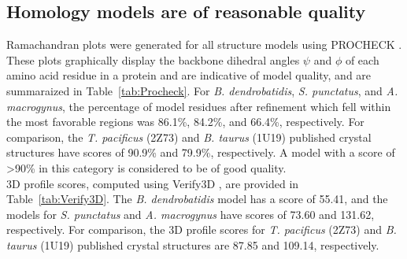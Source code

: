 \subsection{Homology models are of reasonable quality}
Ramachandran plots were generated for all structure models using PROCHECK \cite{Laskowski1993,Wiederstein2007}. These plots graphically display the backbone dihedral angles $\psi$ and $\phi$ of each amino acid residue in a protein and are indicative of model quality, and are summaraized in Table~\ref{tab:Procheck}. For \textit{B. dendrobatidis}, \textit{S. punctatus}, and \textit{A. macrogynus}, the percentage of model residues after refinement which fell within the most favorable regions was 86.1\%, 84.2\%, and 66.4\%, respectively. For comparison, the \textit{T. pacificus} (2Z73) and \textit{B. taurus} (1U19) published crystal structures have scores of 90.9\% and 79.9\%, respectively. A model with a score of \textgreater 90\% in this category is considered to be of good quality.\\
\indent 3D profile scores, computed using Verify3D \cite{Luthy1992}, are provided in Table~\ref{tab:Verify3D}. The \textit{B. dendrobatidis} model has a score of 55.41, and the models for \textit{S. punctatus} and \textit{A. macrogynus} have scores of 73.60 and 131.62, respectively. For comparison, the 3D profile scores for \textit{T. pacificus} (2Z73) and \textit{B. taurus} (1U19) published crystal structures are 87.85 and 109.14, respectively.
